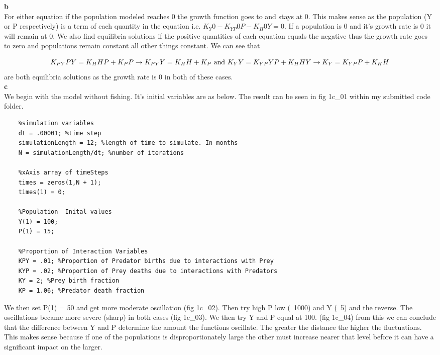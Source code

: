 \documentclass{article}
\begin{document}
  \textbf{b}\\

  For either equation if the population modeled reaches 0 the growth function goes to
  and stays at 0.
  This makes sense as the population (Y or P respectively) is a term of each quantity
  in the equation i.e. $K_{Y}0 - K_{YP}0P - K_{H}0Y = 0$. If a population is 0 and
  it's growth rate is 0 it will remain at
  0. We also find equilibria solutions if the positive quantities of each equation equals the
  negative thus the growth rate goes to zero and populations remain constant all other things
  constant. We can see that

  \[
    K_{PY}PY  =  K_{H}HP + K_{P}P \to K_{PY}Y  =  K_{H}H + K_{P}\\
    \text{ and }\\
    K_{Y}Y = K_{YP}YP + K_{H}HY \to K_{Y} = K_{YP}P + K_{H}H\\
  \]
\pagebreak
  are both equilibria solutions as the growth rate is 0 in both of these cases.\\

  \textbf{c}\\
  We begin with the model without fishing. It's initial variables are as below.
  The result can be seen in fig 1c\_01 within my submitted code folder.\\

  \begin{verbatim}
    %simulation variables
    dt = .00001; %time step
    simulationLength = 12; %length of time to simulate. In months
    N = simulationLength/dt; %number of iterations

    %xAxis array of timeSteps
    times = zeros(1,N + 1);
    times(1) = 0;

    %Population  Inital values
    Y(1) = 100;
    P(1) = 15;

    %Proportion of Interaction Variables
    KPY = .01; %Proportion of Predator births due to interactions with Prey
    KYP = .02; %Proportion of Prey deaths due to interactions with Predators
    KY = 2; %Prey birth fraction
    KP = 1.06; %Predator death fraction
  \end{verbatim}

  We then set P(1) = 50  and  get more moderate oscillation (fig 1c\_02).
  Then try high P low (~1000) and Y (~5) and the reverse. The oscillations became
  more severe (sharp) in both cases (fig 1c\_03). We then try Y and P equal at 100.
  (fig 1c\_04) from this we can conclude that the difference between Y and P determine
  the amount the functions oscillate. The greater the distance the higher the
  fluctuations. This makes sense because if one of the populations is disproportionately
  large the other must increase  nearer that level before it can have a significant
  impact on the larger.\\
\end{document}
